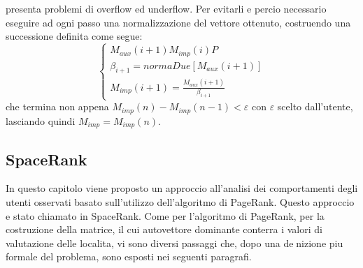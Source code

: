 presenta problemi di overflow ed underflow. Per evitarli e percio necessario
eseguire ad ogni passo una normalizzazione del vettore ottenuto, costruendo
una successione definita come segue:
\begin{equation}
\left\{\begin{matrix}
M_{aux}(i+1) M_{imp}(i)P
\\ \beta_{i+1} = normaDue[M_{aux}(i+1)]
\\ M_{imp}(i+1) = \frac{M_{aux}(i+1)}{\beta_{i+1}}
\end{matrix}\right.
\end{equation}
che termina non appena $ M_{imp}(n) - M_{imp}(n- 1) < \varepsilon $ con $ \varepsilon $ scelto dall'utente,
lasciando quindi $ M_{imp} = M_{imp}(n) $.

\subsection{SpaceRank}
In questo capitolo viene proposto un approccio all'analisi dei comportamenti
degli utenti osservati basato sull'utilizzo dell'algoritmo di PageRank. Questo
approccio e stato chiamato in \cite{cit_49} SpaceRank. Come per l'algoritmo di PageRank,
per la costruzione della matrice, il cui autovettore dominante conterra
i valori di valutazione delle localita, vi sono diversi passaggi che, dopo una
denizione piu formale del problema, sono esposti nei seguenti paragrafi.


